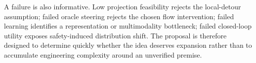 \documentclass[10pt,conference]{IEEEtran}
\newcommand{\1}{\mathbf{1}}
\begin{document}
A failure is also informative. Low projection feasibility rejects the local-detour assumption; failed oracle steering rejects the chosen flow intervention; failed learning identifies a representation or multimodality bottleneck; failed closed-loop utility exposes safety-induced distribution shift. The proposal is therefore designed to determine quickly whether the idea deserves expansion rather than to accumulate engineering complexity around an unverified premise.



\end{document}

